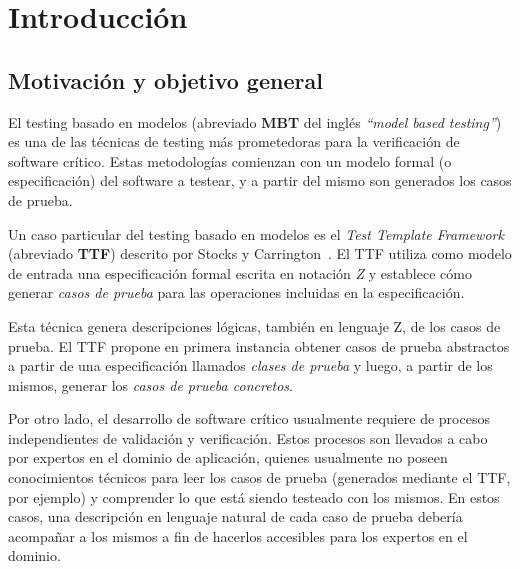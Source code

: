 \chapter{Introducción}
\label{introduccion}

\section{Motivación y objetivo general}
El testing basado en modelos (abreviado \textbf{MBT} del inglés \emph{``model based testing''}) es una de las técnicas de testing más prometedoras para la verificación de software crítico. Estas metodologías comienzan con un modelo formal (o especificación) del software a testear, y a partir del mismo son generados los casos de prueba.

Un caso particular del testing basado en modelos es el \emph{Test Template Framework} (abreviado \textbf{TTF}) descrito por Stocks y Carrington~\cite{stocks}. El TTF utiliza como modelo de entrada una especificación formal escrita en notación \emph{Z} y establece cómo generar \emph{casos de prueba} para las operaciones incluidas en la especificación. 

Esta técnica genera descripciones lógicas, también en lenguaje Z, de los casos de prueba. El TTF propone en primera instancia obtener casos de prueba abstractos a partir de una especificación llamados \emph{clases de prueba} y luego, a partir de los mismos, generar los \emph{casos de prueba concretos}.

Por otro lado, el desarrollo de software crítico usualmente requiere de procesos independientes de validación y verificación. Estos procesos son llevados a cabo por expertos en el dominio de aplicación, quienes usualmente no poseen conocimientos técnicos para leer los casos de prueba (generados mediante el TTF, por ejemplo) y comprender lo que está siendo testeado con los mismos. En estos casos, una descripción en lenguaje natural de cada caso de prueba debería acompañar a los mismos a fin de hacerlos accesibles para los expertos en el dominio.  

